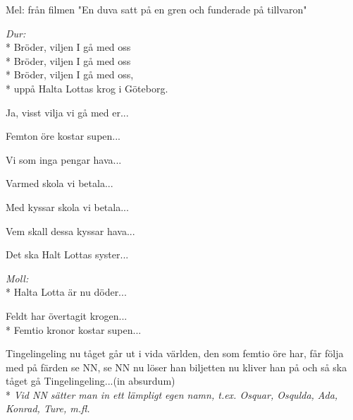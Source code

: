 \begin{SongText}
    \begin{SongInfo}
        Mel: från filmen "En duva satt på en gren och funderade på tillvaron"
    \end{SongInfo}
    \begin{SongVerse}
        \textit{Dur:}\\*%
        Bröder, viljen I gå med oss\\*%
        Bröder, viljen I gå med oss\\*%
        Bröder, viljen I gå med oss,\\*%
        uppå Halta Lottas krog i Göteborg.
    \end{SongVerse}
    \begin{SongVerse}
        Ja, visst vilja vi gå med er...
    \end{SongVerse}
    \begin{SongVerse}
        Femton öre kostar supen...
    \end{SongVerse}
    \begin{SongVerse}
        Vi som inga pengar hava...
    \end{SongVerse}
    \begin{SongVerse}
        Varmed skola vi betala...
    \end{SongVerse}
    \begin{SongVerse}
        Med kyssar skola vi betala...
    \end{SongVerse}
    \begin{SongVerse}
        Vem skall dessa kyssar hava...
    \end{SongVerse}
    \begin{SongVerse}
        Det ska Halt Lottas syster...
    \end{SongVerse}
    \begin{SongVerse}
        \textit{Moll:}  \\*%
        Halta Lotta är nu döder...
    \end{SongVerse}
    \begin{SongVerse}
        Feldt har övertagit krogen...\\*%
        Femtio kronor kostar supen...
    \end{SongVerse}
\end{SongText}
\begin{SongText}[Tingelingeling]
    \begin{SongVerse}
        Tingelingeling nu tåget går
        ut i vida världen,
        den som femtio öre har,
        får följa med på färden
        se NN, se NN
        nu löser han biljetten
        nu kliver han på
        och så ska tåget gå
        Tingelingeling...(in absurdum)\\*%
        \emph{Vid NN sätter man in ett lämpligt egen namn,
            t.ex. Osquar, Osqulda, Ada, Konrad, Ture, m.fl. }
    \end{SongVerse}
\end{SongText}
